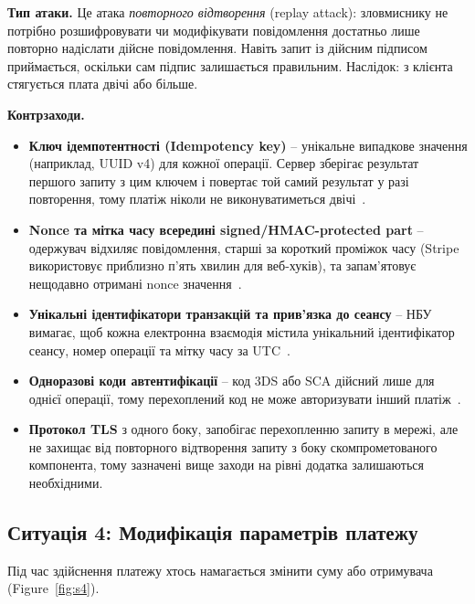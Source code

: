 \textbf{Тип атаки.} Це атака \emph{повторного відтворення} (replay attack): зловмиснику не потрібно розшифровувати 
чи модифікувати повідомлення достатньо лише повторно надіслати дійсне повідомлення. Навіть запит із дійсним 
підписом приймається, оскільки сам підпис залишається правильним. Наслідок: з клієнта стягується плата двічі або 
більше.

\textbf{Контрзаходи.}
\begin{itemize}[noitemsep]
    \item \textbf{Ключ ідемпотентності (Idempotency key)} -- унікальне випадкове значення (наприклад, UUID v4) для 
        кожної операції. Сервер зберігає результат першого запиту з цим ключем і повертає той самий результат у 
        разі повторення, тому платіж ніколи не виконуватиметься двічі~\cite{stripe_idempotency}.
    \item \textbf{Nonce та мітка часу всередині signed/HMAC-protected part} -- одержувач відхиляє повідомлення, 
        старші за короткий проміжок часу (Stripe використовує приблизно п'ять хвилин для веб-хуків), та запам'ятовує 
        нещодавно отримані nonce значення~\cite{stripe_webhook_signature}.
    \item \textbf{Унікальні ідентифікатори транзакцій та прив'язка до сеансу} -- НБУ вимагає, щоб кожна електронна 
        взаємодія містила унікальний ідентифікатор сеансу, номер операції та мітку часу за UTC~\cite[п.~74]{nbu58}.
    \item \textbf{Одноразові коди автентифікації} -- код 3DS або SCA дійсний лише для однієї операції, тому 
        перехоплений код не може авторизувати інший платіж~\cite[п.~16]{nbu58}.
    \item \textbf{Протокол TLS} з одного боку, запобігає перехопленню запиту в мережі, але не захищає від повторного 
        відтворення запиту з боку скомпрометованого компонента, тому зазначені вище заходи на рівні додатка 
        залишаються необхідними.
\end{itemize}

\subsection{Ситуація 4: Модифікація параметрів платежу}
\label{sec:s4}

Під час здійснення платежу хтось намагається змінити суму або отримувача (Figure~\ref{fig:s4}).

